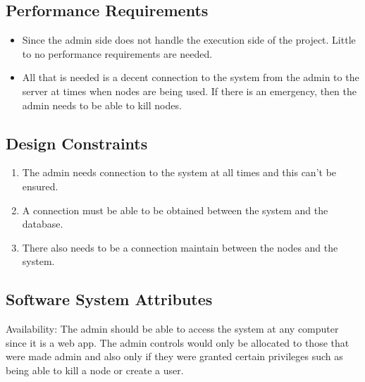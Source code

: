 \subsection{Performance Requirements}
\begin{itemize}
    \item Since the admin side does not handle the execution side of the project. Little to no performance requirements are needed.
    \item All that is needed is a decent connection to the system from the admin to the server at times when nodes are being used. If there is an emergency, then the admin needs to be able to kill nodes.

\end{itemize}
\subsection{Design Constraints}
\begin{enumerate}
	\item The admin needs connection to the system at all times and this can't be ensured.
    \item A connection must be able to be obtained between the system and the database.
    \item There also needs to be a connection maintain between the nodes and the system.

\end{enumerate}
\subsection{Software System Attributes}
Availability:  The admin should be able to access the system at any computer since it is a web app. The admin controls would only be allocated to those that were made admin and also only if they were granted certain privileges such as being able to kill a node or create a user.



